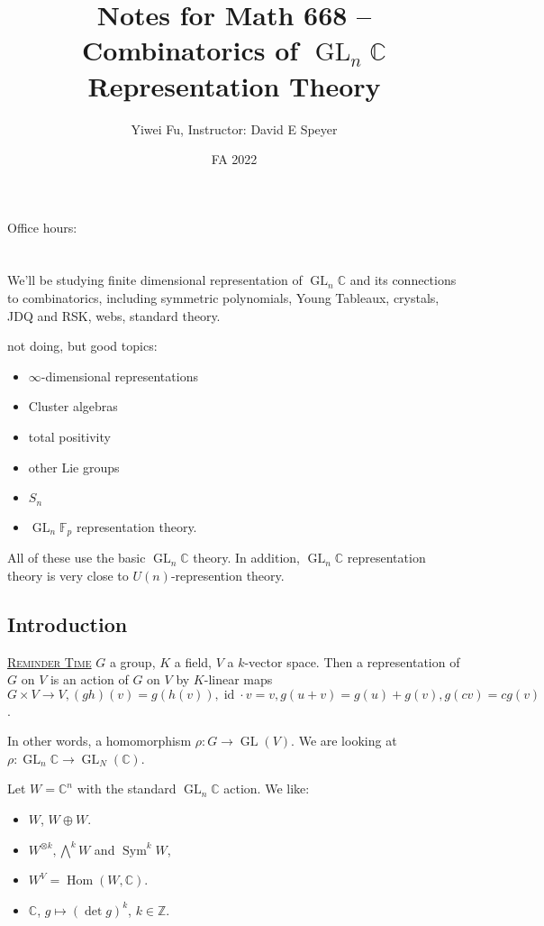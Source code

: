 \documentclass{report}
\newcommand{\C}{\mathbb{C}}
\newcommand{\Z}{\mathbb{Z}}
\newcommand{\F}{\mathbb{F}}
\def \Hom {\operatorname{Hom}}
\def \id {\operatorname{id}}
\def \GL {\operatorname{GL}}
\def \Sym {\operatorname{Sym}}
\newcommand{\fancyem}[1]{\underline{\textsc{#1}}}
\theoremstyle{definition}
\theoremstyle{remark}
\numberwithin{equation}{section}
\begin{document}
\title{Notes for Math 668 -- Combinatorics of $\GL_n\C$ Representation Theory}
\author{Yiwei Fu, Instructor: David E Speyer}
\date{FA 2022}
\maketitle


\tableofcontents
Office hours: 

\clearpage
{}


\chapter{}
We'll be studying finite dimensional representation of $\GL_n\C$ and its connections to combinatorics, including symmetric polynomials, Young Tableaux, crystals, JDQ and RSK, webs, standard theory.

not doing, but good topics:
\begin{itemize}
    \item $\infty$-dimensional representations
    \item Cluster algebras
    \item total positivity
    \item other Lie groups
    \item $S_n$
    \item $\GL_n\F_p$ representation theory.
\end{itemize}
All of these use the basic $\GL_n\C$ theory. In addition, $\GL_n\C$ representation theory is very close to $U(n)$-represention theory.

\section{Introduction}
\fancyem{Reminder Time}
$G$ a group, $K$ a field, $V$ a $k$-vector space. Then a representation of $G$ on $V$ is an action of $G$ on $V$ by $K$-linear maps $G \times V \to V, (gh)(v) = g(h(v)), \id \cdot v = v, g(u + v) = g(u) + g(v), g(cv) = cg(v)$.

In other words, a homomorphism $\rho: G \to \GL(V)$. We are looking at $\rho: \GL_n\C \to \GL_N(\C)$.

Let $W = \C^n$ with the standard $\GL_n\C$ action. We like:
\begin{itemize}
    \item $W$, $W \oplus W$.
    \item $W^{\otimes k}, \bigwedge^k W$ and $\Sym^k W$,
    \item $W^V = \Hom(W, \C)$.
    \item $\C$, $g \mapsto (\det g)^k$, $k \in \Z$.
\end{itemize}
\end{document}
